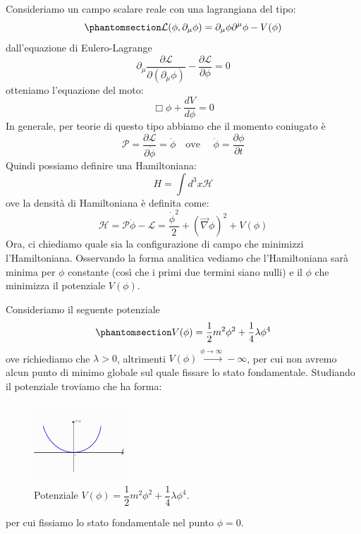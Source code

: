 Consideriamo un campo scalare reale con una lagrangiana del tipo:
\begin{equation}\phantomsection\label{eq:lag}
  \mathcal{L}(\phi,\partial_\mu\phi)=\partial_\mu\phi\partial^\mu\phi-V(\phi)
\end{equation}
dall'equazione di Eulero-Lagrange
\begin{equation}
    \partial_\mu\dfrac{\partial \mathcal{L}}{\partial(\partial_\mu\phi)}-\dfrac{\partial\mathcal{L}}{\partial \phi}=0
\end{equation}
otteniamo l'equazione del moto:
\begin{equation}
   \Box \phi+\dfrac{dV}{d\phi}=0
\end{equation}
In generale, per teorie di questo tipo abbiamo che il momento coniugato è
\begin{equation}
    \mathcal{P}=\dfrac{\partial\mathcal{L}}{\partial \Dot{\phi}}=\Dot{\phi} \quad \text{ove }\quad\dot{\phi}=\dfrac{\partial \phi}{\partial t}
\end{equation}
Quindi possiamo definire una Hamiltoniana:
\begin{equation}
    H=\int d^3x\mathcal{H}
\end{equation}
ove la densità di Hamiltoniana è definita come:
\begin{equation}
    \mathcal{H}=\mathcal{P}\dot{\phi}-\mathcal{L}=\dfrac{\dot{\phi}^2}{2}+\left(\Vec{\nabla}\phi\right)^2+V(\phi)
\end{equation}
Ora, ci chiediamo quale sia la configurazione di campo che minimizzi l'Hamiltoniana. Osservando la forma analitica vediamo che l'Hamiltoniana sarà minima per $\phi$ constante (così che i primi due termini siano nulli) e il $\phi$ che minimizza il potenziale $V(\phi)$.

 Consideriamo il seguente potenziale
 \begin{equation}\phantomsection\label{eq:pot_1}
    V(\phi)=\dfrac{1}{2}m^2\phi^2+\dfrac{1}{4}\lambda\phi^4
\end{equation}
ove richiediamo che $\lambda>0$, altrimenti $ V(\phi)\xrightarrow{\phi\xrightarrow{}\infty}-\infty$, per cui non avremo alcun punto di minimo globale sul quale fissare lo stato fondamentale. Studiando il potenziale troviamo che ha forma:
\begin{figure}[H]
    \centering
    \includegraphics[width=0.31\textwidth]{Immagini/Pot1.jpg}
    \caption{Potenziale $ V(\phi)=\dfrac{1}{2}m^2\phi^2+\dfrac{1}{4}\lambda\phi^4$.}
    \label{fig:pot1}
\end{figure}
per cui fissiamo lo stato fondamentale nel punto $\phi=0$.

